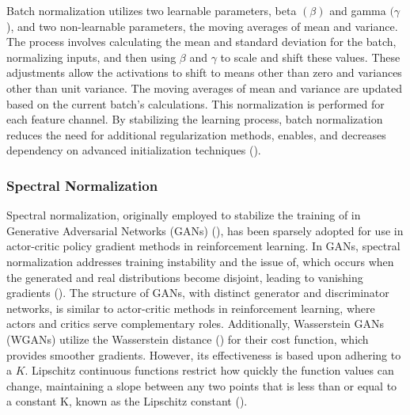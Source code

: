         \bigskip
        
        \noindent Batch normalization utilizes two learnable parameters, beta $(\beta)$ and gamma $(\gamma$), and two non-learnable parameters, the moving averages of mean and variance. The process involves calculating the mean and standard deviation for the batch, normalizing inputs, and then using $\beta$ and $\gamma$ to scale and shift these values. These adjustments allow the activations to shift to means other than zero and variances other than unit variance. The moving averages of mean and variance are updated based on the current batch's calculations. This normalization is performed for each feature channel. By stabilizing the learning process, batch normalization reduces the need for additional regularization methods, enables, and decreases dependency on advanced initialization techniques (\cite{ioffe2015batch}).

    \subsubsection{Spectral Normalization} \label{subsec:spectralnorm}

        \noindent Spectral normalization, originally employed to stabilize the training of in Generative Adversarial Networks (GANs) (\cite{miyato2018spectral}), has been sparsely adopted for use in actor-critic policy gradient methods in reinforcement learning. In GANs, spectral normalization addresses training instability and the issue of, which occurs when the generated and real distributions become disjoint, leading to vanishing gradients (\cite{yoshida2017spectral}). The structure of GANs, with distinct generator and discriminator networks, is similar to actor-critic methods in reinforcement learning, where actors and critics serve complementary roles. Additionally, Wasserstein GANs (WGANs) utilize the Wasserstein distance (\cite{wiki:Wasserstein_metric}) for their cost function, which provides smoother gradients. However, its effectiveness is based upon adhering to a $K$. Lipschitz continuous functions restrict how quickly the function values can change, maintaining a slope between any two points that is less than or equal to a constant K, known as the Lipschitz constant (\cite{wiki:Lipschitz_continuity}).
        
